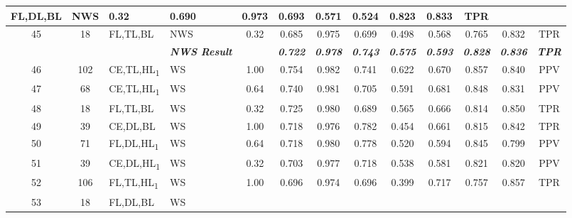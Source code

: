 \begin{table}[H]
{\begin{tabular}{ccl|l|c|c|c|c|c|c|c|c|c|}
    FL,DL,BL &
    NWS &
    0.32 &
    0.690 &
    0.973 &
    0.693 &
    0.571 &
    0.524 &
    0.823 &
    0.833 &
    TPR \\ \hline
  \multicolumn{1}{|c|}{45} &
    \multicolumn{1}{c|}{18} &
    FL,TL,BL &
    NWS &
    0.32 &
    0.685 &
    0.975 &
    0.699 &
    0.498 &
    0.568 &
    0.765 &
    0.832 &
    TPR \\ \hline
   &
    \textit{\textbf{}} &
     &
    \textit{\textbf{NWS Result}} &
     &
    \textit{\textbf{0.722}} &
    \textit{\textbf{0.978}} &
    \textit{\textbf{0.743}} &
    \textit{\textbf{0.575}} &
    \textit{\textbf{0.593}} &
    \textit{\textbf{0.828}} &
    \textit{\textbf{0.836}} &
    \textit{\textbf{TPR}} \\ \hline
  \multicolumn{1}{|c|}{46} &
    \multicolumn{1}{c|}{102} &
    CE,TL,HL\textsubscript{1} &
    WS &
    1.00 &
    0.754 &
    0.982 &
    0.741 &
    0.622 &
    0.670 &
    0.857 &
    0.840 &
    PPV \\ \hline
  \multicolumn{1}{|c|}{47} &
    \multicolumn{1}{c|}{68} &
    CE,TL,HL\textsubscript{1} &
    WS &
    0.64 &
    0.740 &
    0.981 &
    0.705 &
    0.591 &
    0.681 &
    0.848 &
    0.831 &
    PPV \\ \hline
  \multicolumn{1}{|c|}{48} &
    \multicolumn{1}{c|}{18} &
    FL,TL,BL &
    WS &
    0.32 &
    0.725 &
    0.980 &
    0.689 &
    0.565 &
    0.666 &
    0.814 &
    0.850 &
    TPR \\ \hline
  \multicolumn{1}{|c|}{49} &
    \multicolumn{1}{c|}{39} &
    CE,DL,BL &
    WS &
    1.00 &
    0.718 &
    0.976 &
    0.782 &
    0.454 &
    0.661 &
    0.815 &
    0.842 &
    TPR \\ \hline
  \multicolumn{1}{|c|}{50} &
    \multicolumn{1}{c|}{71} &
    FL,DL,HL\textsubscript{1} &
    WS &
    0.64 &
    0.718 &
    0.980 &
    0.778 &
    0.520 &
    0.594 &
    0.845 &
    0.799 &
    PPV \\ \hline
  \multicolumn{1}{|c|}{51} &
    \multicolumn{1}{c|}{39} &
    CE,DL,HL\textsubscript{1} &
    WS &
    0.32 &
    0.703 &
    0.977 &
    0.718 &
    0.538 &
    0.581 &
    0.821 &
    0.820 &
    PPV \\ \hline
  \multicolumn{1}{|c|}{52} &
    \multicolumn{1}{c|}{106} &
    FL,TL,HL\textsubscript{1} &
    WS &
    1.00 &
    0.696 &
    0.974 &
    0.696 &
    0.399 &
    0.717 &
    0.757 &
    0.857 &
    TPR \\ \hline
  \multicolumn{1}{|c|}{53} &
    \multicolumn{1}{c|}{18} &
    FL,DL,BL &
    WS &

\end{tabular}}
\end{table}
